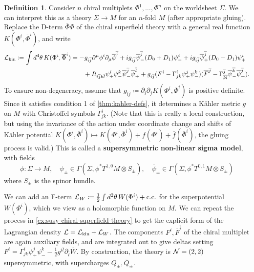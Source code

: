 \documentclass{report}
\theoremstyle{plain}
\theoremstyle{definition}
\newtheorem{definition}[theorem]{Definition}
\theoremstyle{remark}
\newcommand{\di}{\partial}
\newcommand{\cnj}{\overline}
\begin{document}
\begin{definition}
  Consider $n$ chiral multiplets $\Phi^1, \ldots, \Phi^n$ on the
  worldsheet $\Sigma$. We can interpret this as a theory $\Sigma \to
  M$ for an $n$-fold $M$ (after appropriate gluing). Replace the
  D-term $\cnj\Phi\Phi$ of the chiral superfield theory with a general
  real function $K(\Phi^i, \cnj\Phi^i)$, and write
  \begin{align} \label{eq:nlsm-lagrangian}
    \begin{split}
      {\cal L}_{\text{kin}} \coloneqq \int d^4\theta \, K(\Phi^i, \cnj\Phi^i)
      &= -g_{i\cnj j} \di^\mu \phi^i \di_\mu \cnj\phi^{\cnj j} + ig_{i\cnj j} \cnj \psi^{\cnj j}_-(D_0 + D_1)\psi_-^i + ig_{i\cnj j} \cnj \psi^{\cnj j}_+(D_0 - D_1)\psi_+^i \\
      &\qquad + R_{i\cnj j k \cnj l} \psi_+^i \psi_-^k \cnj\psi_-^{\cnj j} \cnj\psi_+^{\cnj l} + g_{i\cnj j}(F^i - \Gamma^i_{jk} \psi_+^j \psi_-^k)(\cnj F^{\cnj j} - \Gamma^{\cnj j}_{\cnj k \cnj l} \cnj\psi_-^{\cnj k} \cnj\psi_+^{\cnj j}).
    \end{split}
  \end{align}
  To ensure non-degeneracy, assume that $g_{i\cnj j} \coloneqq \di_i
  \di_j K(\Phi^i, \cnj\Phi^i)$ is positive definite. Since it
  satisfies condition 1 of \ref{thm:kahler-defs}, it determines a
  K\"ahler metric $g$ on $M$ with Christoffel symbols $\Gamma^i_{jk}$.
  (Note that this is really a local construction, but using the
  invariance of the action under coordinate change and shifts of
  K\"ahler potential $K(\Phi^i, \cnj\Phi^i) \mapsto K(\Phi^i,
  \cnj\Phi^i) + f(\Phi^i) + \cnj f(\cnj \Phi^i)$, the gluing process
  is valid.) This is called a {\bf supersymmetric non-linear sigma
    model}, with fields
  \[ \phi\colon \Sigma \to M, \quad \psi_\pm \in \Gamma(\Sigma, \phi^*T^{1,0}M \otimes S_\pm), \quad \cnj\psi_\pm \in \Gamma(\Sigma, \phi^*T^{0,1}M \otimes S_\pm) \]
  where $S_\pm$ is the spinor bundle.

  We can add an F-term ${\cal L}_W \coloneqq \frac{1}{2} \int
  d^2\theta \, W(\Phi^i) + \text{c.c.}$ for the superpotential
  $W(\Phi^i)$, which we view as a holomorphic function on $M$. We can
  repeat the process in \ref{ex:susy-chiral-superfield-theory} to get
  the explicit form of the Lagrangian density ${\cal L} = {\cal
    L}_{\text{kin}} + {\cal L}_W$. The components $F^i, \cnj F^{\cnj
    i}$ of the chiral multiplet are again auxiliary fields, and are
  integrated out to give deltas setting $F^i = \Gamma^i_{jk}\psi_+^j
  \psi_-^k - \frac{1}{2} g^{i\cnj l} \di_{\cnj l}\cnj W$. By
  construction, the theory is ${\cal N} = (2,2)$ supersymmetric, with
  supercharges $Q_\pm, \cnj Q_\pm$.
\end{definition}
\end{document}
